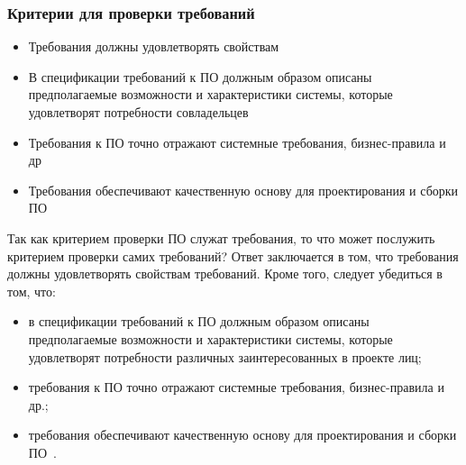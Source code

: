 \documentclass{../industrial-development}
\begin{document}
{\begin{frame} \frametitle {Критерии для проверки требований}
\begin{itemize}
\item Требования должны удовлетворять свойствам
\item В спецификации требований к ПО должным образом описаны предполагаемые возможности и характеристики системы, которые удовлетворят потребности совладельцев
\item Требования к ПО точно отражают системные требования, бизнес-правила и др
\item Требования обеспечивают качественную основу для проектирования и сборки ПО
\end{itemize}
\end{frame}

\lecturenotes

Так как критерием проверки ПО служат требования, то что может послужить критерием проверки самих требований? Ответ заключается в том, что требования должны удовлетворять свойствам требований. Кроме того, следует убедиться в том, что:
\begin{itemize}
\item в спецификации требований к ПО должным образом описаны предполагаемые возможности и характеристики системы, которые удовлетворят потребности различных заинтересованных в проекте лиц;
\item требования к ПО точно отражают системные требования, бизнес-правила и др.;
\item требования обеспечивают качественную основу для проектирования и сборки ПО~\cite[с.~64]{Maglinec}.
\end{itemize}


}
\end{document}
